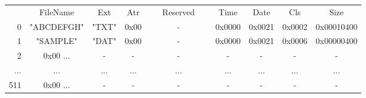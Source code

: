 \documentclass[border=1mm]{standalone}
\begin{document}
\tt\small\begin{tabular}{r | c | c | c | c | c | c | c | c|}
\multicolumn{1}{c}{} &
\multicolumn{1}{c}{FileName} &
\multicolumn{1}{c}{Ext} &
\multicolumn{1}{c}{Atr} &
\multicolumn{1}{c}{~~~Reserved~~~} &
\multicolumn{1}{c}{Time} &
\multicolumn{1}{c}{Date} &
\multicolumn{1}{c}{Cls} &
\multicolumn{1}{c}{Size} \\\cline{2-9}
0 & "ABCDEFGH" & "TXT" &
0x00 & - & 0x0000 & 0x0021 & 0x0002 & 0x00010400 \\\cline{2-9}
1 & "SAMPLE\textvisiblespace\textvisiblespace" & "DAT" &
0x00 & - & 0x0000 & 0x0021 & 0x0006 & 0x00000400 \\\cline{2-9}
2 & 0x00 ... & - &
- & - & - & - & - & - \\\cline{2-9}
... & ... & ... &
... & ... & ... & ... & ... & ... \\\cline{2-9}
511 & 0x00 ... & - &
- & - & - & - & - & - \\\cline{2-9}
\end{tabular}
\end{document}
